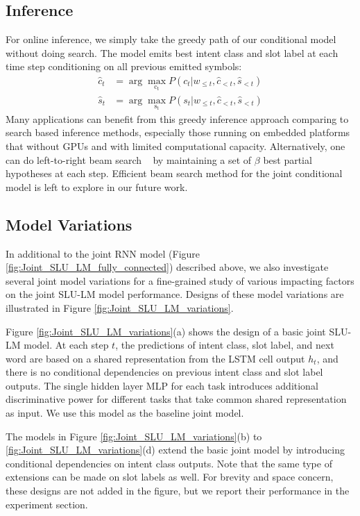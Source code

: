 \documentclass[11pt]{article}
\begin{document}
\subsection{Inference}
    For online inference, we simply take the greedy path of our conditional model without doing search. The model emits best intent class and slot label at each time step conditioning on all previous emitted symbols:
            \begin{align}
                \hat{c}_t &= \operatorname{\arg\max_ {c_t}} P(c_t|w_{\leq t}, \hat{c}_{<t}, \hat{s}_{<t}) \\
                \hat{s}_t &= \operatorname{\arg\max_ {s_t}} P(s_t|w_{\leq t}, \hat{c}_{<t}, \hat{s}_{<t})
            \end{align}
    Many applications can benefit from this greedy inference approach comparing to search based inference methods, especially those running on embedded platforms that without GPUs and with limited computational capacity. Alternatively, one can do left-to-right beam search ~\cite{sutskever:14,chan:15} by maintaining a set of $\beta$ best partial hypotheses at each step. Efficient beam search method for the joint conditional model is left to explore in our future work.

\subsection{Model Variations}
    In additional to the joint RNN model (Figure \ref{fig:Joint_SLU_LM_fully_connected}) described above, we also investigate several joint model variations for a fine-grained study of various impacting factors on the joint SLU-LM model performance. Designs of these model variations are illustrated in Figure \ref{fig:Joint_SLU_LM_variations}. 
    
    Figure \ref{fig:Joint_SLU_LM_variations}(a) shows the design of a basic joint SLU-LM model. At each step $t$, the predictions of intent class, slot label, and next word are based on a shared representation from the LSTM cell output $h_t$, and there is no conditional dependencies on previous intent class and slot label outputs. The single hidden layer MLP for each task introduces additional discriminative power for different tasks that take common shared representation as input. We use this model as the baseline joint model.
    
    The models in Figure \ref{fig:Joint_SLU_LM_variations}(b) to \ref{fig:Joint_SLU_LM_variations}(d) extend the basic joint model by introducing conditional dependencies on intent class outputs. Note that the same type of extensions can be made on slot labels as well. For brevity and space concern, these designs are not added in the figure, but we report their performance in the experiment section.
    
\end{document}
